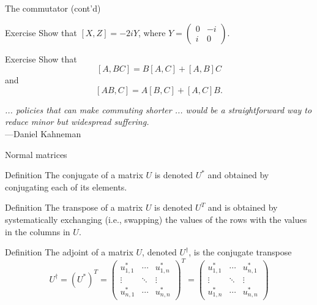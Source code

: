 \documentclass{beamer}
\begin{document}
\begin{frame}{The commutator (cont'd)}

\begin{block}{Exercise}
Show that $[X,Z] = -2iY$, where $Y=\begin{pmatrix}
    0 & -i \\ i & 0
\end{pmatrix}$.
\end{block}

\begin{block}{Exercise}
Show that $$[A,BC] = B[A,C] + [A, B]C$$ and $$[AB, C]=A[B,C]+[A,C]B.$$
\end{block}

\begin{flushright}
    \textit{... policies that can make commuting shorter ... would be a straightforward way to reduce minor but widespread suffering.}\\---Daniel Kahneman
\end{flushright}

\end{frame}

\begin{frame}{Normal matrices}

\begin{block}{Definition}
    The conjugate of a matrix $U$ is denoted $U^*$ and obtained by conjugating each of its elements.
\end{block}

\begin{block}{Definition}
The transpose of a matrix $U$ is denoted $U^T$ and is obtained by systematically exchanging (i.e., swapping) the values of the rows with the values in the columns in $U$.
\end{block}

\begin{block}{Definition}
    The adjoint of a matrix $U$, denoted $U^\dagger$, is the conjugate transpose $$ U^\dagger = (U^*)^T = \begin{pmatrix}
        u_{1,1}^* & \cdots & u_{1,n}^* \\
        \vdots & \ddots & \vdots \\
        u_{n,1}^* & \cdots & u_{n,n}^*
    \end{pmatrix}^T = \begin{pmatrix}
        u_{1,1}^* & \cdots & u_{n,1}^* \\
        \vdots & \ddots & \vdots \\
        u_{1,n}^* & \cdots & u_{n,n}^*
    \end{pmatrix}$$ 
\end{block}
\end{frame}
\end{document}
